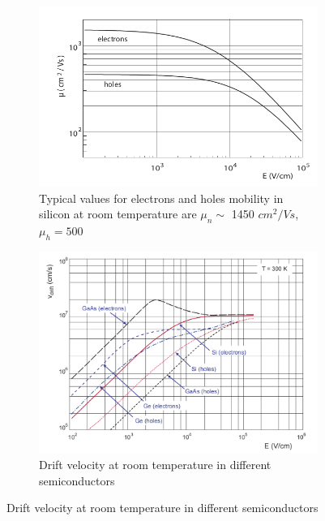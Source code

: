     \begin{figure}[h!]
        \begin{subfigure}{.5\textwidth}
        \centering
        \includegraphics[width=.8\linewidth]{figures/overview/mobility_in_semiconductor.png}
        \caption{Typical values for electrons and holes mobility 
        in silicon at room temperature are $\mu _n \sim$ 1450 $cm^2/Vs$, $\mu _h = 500$}
        \label{fig:mobility_drift1}
        \end{subfigure}
        \begin{subfigure}{.5\textwidth}
        \centering
        \includegraphics[width=.8\linewidth]{figures/overview/velocity_in_semiconductor.png}
        \caption{Drift velocity at room temperature in different semiconductors}
        \label{fig:mobility_drift2}
        \end{subfigure}
        \label{fig:mobility_drift}
    \end{figure}

